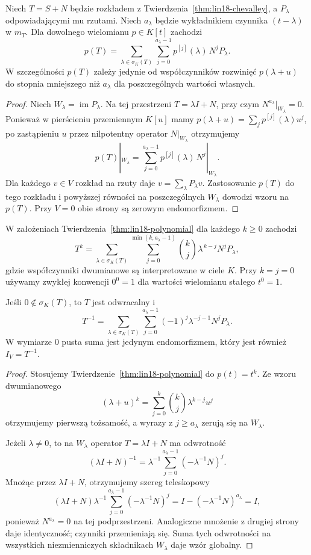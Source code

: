 \begin{twierdzenie}
\label{thm:lin18-polynomial}
Niech \(T=S+N\) będzie rozkładem
z Twierdzenia~\ref{thm:lin18-chevalley},
a \(P_\lambda\) odpowiadającymi mu rzutami.
Niech \(a_\lambda\) będzie wykładnikiem
czynnika \((t-\lambda)\) w \(m_T\).
Dla dowolnego wielomianu \(p\in K[t]\)
zachodzi
\[
 p(T)=
 \sum_{\lambda\in\sigma_K(T)}
 \sum_{j=0}^{a_\lambda-1}
 p^{[j]}(\lambda)\,N^jP_\lambda.
\]
W szczególności \(p(T)\) zależy
jedynie od współczynników rozwinięć
\(p(\lambda+u)\) do stopnia
mniejszego niż \(a_\lambda\)
dla poszczególnych wartości własnych.
\end{twierdzenie}
\begin{proof}
Niech \(W_\lambda=\operatorname{im}P_\lambda\).
Na tej przestrzeni \(T=\lambda I+N\),
przy czym \(N^{a_\lambda}|_{W_\lambda}=0\).
Ponieważ w pierścieniu przemiennym \(K[u]\)
mamy
\(p(\lambda+u)=\sum_jp^{[j]}(\lambda)u^j\),
po zastąpieniu \(u\) przez
nilpotentny operator \(N|_{W_\lambda}\)
otrzymujemy
\[
 p(T)|_{W_\lambda}
 =\sum_{j=0}^{a_\lambda-1}
       p^{[j]}(\lambda)\,N^j|_{W_\lambda}.
\]
Dla każdego \(v\in V\)
rozkład na rzuty daje
\(v=\sum_\lambda P_\lambda v\).
Zastosowanie \(p(T)\) do tego rozkładu
i powyższej równości na poszczególnych
\(W_\lambda\) dowodzi wzoru na \(p(T)\).
Przy \(V=0\) obie strony są zerowym
endomorfizmem.
\end{proof}

\begin{wniosek}
\label{cor:lin18-powers-inverse}
W założeniach
Twierdzenia~\ref{thm:lin18-polynomial}
dla każdego \(k\ge0\) zachodzi
\[
 T^k=
 \sum_{\lambda\in\sigma_K(T)}
 \sum_{j=0}^{\min(k,a_\lambda-1)}
 \binom{k}{j}\lambda^{\,k-j}N^jP_\lambda,
\]
gdzie współczynniki dwumianowe
są interpretowane w ciele \(K\).
Przy \(k=j=0\) używamy zwykłej
konwencji \(0^0=1\) dla wartości
wielomianu stałego \(t^0=1\).

Jeśli \(0\notin\sigma_K(T)\),
to \(T\) jest odwracalny i
\[
 T^{-1}=
 \sum_{\lambda\in\sigma_K(T)}
 \sum_{j=0}^{a_\lambda-1}
 (-1)^j\lambda^{-j-1}N^jP_\lambda.
\]
W wymiarze \(0\) pusta suma
jest jedynym endomorfizmem,
który jest również \(I_V=T^{-1}\).
\end{wniosek}
\begin{proof}
Stosujemy
Twierdzenie~\ref{thm:lin18-polynomial}
do \(p(t)=t^k\).
Ze wzoru dwumianowego
\[
 (\lambda+u)^k
 =\sum_{j=0}^k\binom{k}{j}\lambda^{k-j}u^j
\]
otrzymujemy pierwszą tożsamość,
a wyrazy z \(j\ge a_\lambda\)
zerują się na \(W_\lambda\).

Jeżeli \(\lambda\ne0\),
to na \(W_\lambda\)
operator \(T=\lambda I+N\)
ma odwrotność
\[
 (\lambda I+N)^{-1}
 =\lambda^{-1}
   \sum_{j=0}^{a_\lambda-1}
       (-\lambda^{-1}N)^j.
\]
Mnożąc przez \(\lambda I+N\),
otrzymujemy szereg teleskopowy
\[
 (\lambda I+N)\lambda^{-1}
 \sum_{j=0}^{a_\lambda-1}(-\lambda^{-1}N)^j
 =I-(-\lambda^{-1}N)^{a_\lambda}=I,
\]
ponieważ \(N^{a_\lambda}=0\)
na tej podprzestrzeni.
Analogiczne mnożenie z drugiej strony
daje identyczność; czynniki przemieniają się.
Suma tych odwrotności na wszystkich
niezmienniczych składnikach \(W_\lambda\)
daje wzór globalny.
\end{proof}

